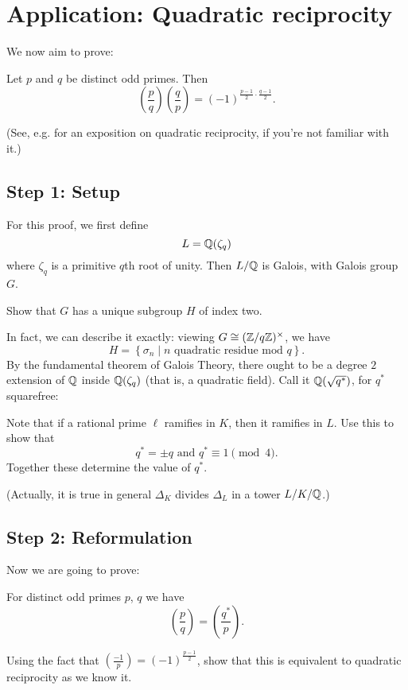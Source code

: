\section{Application: Quadratic reciprocity}
We now aim to prove:
\begin{theorem}
	Let $p$ and $q$ be distinct odd primes.
	Then
	\[ \left( \frac pq \right)\left( \frac qp \right)
		= (-1)^{\frac{p-1}{2} \cdot \frac{q-1}{2}}. \]
\end{theorem}
(See, e.g. \cite{ref:holden} for an exposition on quadratic reciprocity,
if you're not familiar with it.)

\subsection{Step 1: Setup}
For this proof, we first define
\[ L = \mathbb Q(\zeta_q) \]
where $\zeta_q$ is a primitive $q$th root of unity.
Then $L/\mathbb Q$ is Galois, with Galois group $G$.
\begin{ques}
	Show that $G$ has a unique subgroup $H$ of index two.
\end{ques}
In fact, we can describe it exactly: viewing $G \cong (\mathbb Z/q\mathbb Z)^\times$, we have
\[ H = \left\{ \sigma_n \mid \text{$n$ quadratic residue mod $q$} \right\}. \]
By the fundamental theorem of Galois Theory, there ought to be a degree $2$
extension of $\mathbb Q$ inside $\mathbb Q(\zeta_q)$ (that is, a quadratic field).
Call it $\mathbb Q(\sqrt{q^\ast})$, for $q^\ast$ squarefree:
\begin{center}
\end{center}
\begin{exercise}
	Note that if a rational prime $\ell$ ramifies in $K$,
	then it ramifies in $L$.
	Use this to show that
	\[ q^\ast = \pm q \text{ and } q^\ast \equiv 1 \pmod 4. \]
	Together these determine the value of $q^\ast$.
\end{exercise}
(Actually, it is true in general
$\Delta_K$ divides $\Delta_L$ in a tower $L/K/\mathbb Q$.)

\subsection{Step 2: Reformulation}
Now we are going to prove:
\begin{theorem}
	For distinct odd primes $p$, $q$ we have
	\[ \left( \frac pq \right) = \left( \frac{q^\ast}{p} \right). \]
\end{theorem}
\begin{exercise}
	Using the fact that $\left( \frac{-1}{p} \right) = (-1)^{\frac{p-1}{2}}$,
	show that this is equivalent to quadratic reciprocity as we know it.
\end{exercise}

